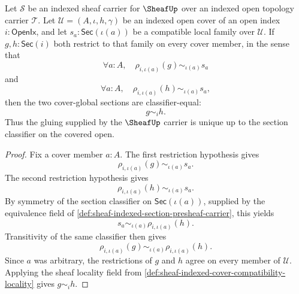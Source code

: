 \begin{theorem}
\label{thm:sheaf-gluing-uniqueness-from-locality}
Let $\mathcal{S}$ be an indexed sheaf carrier for $\SheafUp$ over an indexed open topology carrier $\mathcal{T}$. Let $\mathcal{U}=(A,\iota,h,\gamma)$ be an indexed open cover of an open index $i:\mathsf{OpenIx}$, and let $s_a:\mathsf{Sec}(\iota(a))$ be a compatible local family over $\mathcal{U}$. If $g,h:\mathsf{Sec}(i)$ both restrict to that family on every cover member, in the sense that
$$
\forall a:A,\quad \rho_{i,\iota(a)}(g)\sim_{\iota(a)}s_a
$$
and
$$
\forall a:A,\quad \rho_{i,\iota(a)}(h)\sim_{\iota(a)}s_a,
$$
then the two cover-global sections are classifier-equal:
$$
g\sim_i h.
$$
Thus the gluing supplied by the $\SheafUp$ carrier is unique up to the section classifier on the covered open.
\end{theorem}
\begin{proof}
Fix a cover member $a:A$. The first restriction hypothesis gives
$$
\rho_{i,\iota(a)}(g)\sim_{\iota(a)}s_a.
$$
The second restriction hypothesis gives
$$
\rho_{i,\iota(a)}(h)\sim_{\iota(a)}s_a.
$$
By symmetry of the section classifier on $\mathsf{Sec}(\iota(a))$, supplied by the equivalence field of \autoref{def:sheaf-indexed-section-presheaf-carrier}, this yields
$$
s_a\sim_{\iota(a)}\rho_{i,\iota(a)}(h).
$$
Transitivity of the same classifier then gives
$$
\rho_{i,\iota(a)}(g)\sim_{\iota(a)}\rho_{i,\iota(a)}(h).
$$
Since $a$ was arbitrary, the restrictions of $g$ and $h$ agree on every member of $\mathcal{U}$. Applying the sheaf locality field from \autoref{def:sheaf-indexed-cover-compatibility-locality} gives $g\sim_i h$.
\end{proof}

